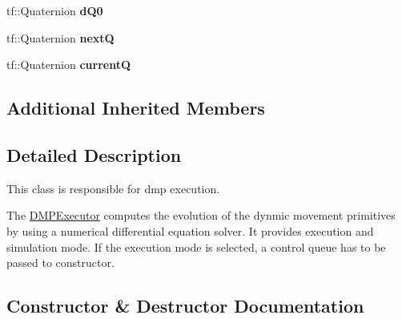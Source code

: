 \begin{DoxyCompactItemize}
\item 
tf\+::\+Quaternion {\bfseries d\+Q0}\hypertarget{classkukadu_1_1DMPExecutor_a7790d0d7320286b8583e54ed35b90720}{}\label{classkukadu_1_1DMPExecutor_a7790d0d7320286b8583e54ed35b90720}

\item 
tf\+::\+Quaternion {\bfseries nextQ}\hypertarget{classkukadu_1_1DMPExecutor_aa438051a0802e9461dec671efb078220}{}\label{classkukadu_1_1DMPExecutor_aa438051a0802e9461dec671efb078220}

\item 
tf\+::\+Quaternion {\bfseries currentQ}\hypertarget{classkukadu_1_1DMPExecutor_adb8f6a613b9e31c1c17202f92e3db83f}{}\label{classkukadu_1_1DMPExecutor_adb8f6a613b9e31c1c17202f92e3db83f}

\end{DoxyCompactItemize}
\subsection*{Additional Inherited Members}


\subsection{Detailed Description}
This class is responsible for dmp execution. 

The \hyperlink{classkukadu_1_1DMPExecutor}{D\+M\+P\+Executor} computes the evolution of the dynmic movement primitives by using a numerical differential equation solver. It provides execution and simulation mode. If the execution mode is selected, a control queue has to be passed to constructor. 

\subsection{Constructor \& Destructor Documentation}
